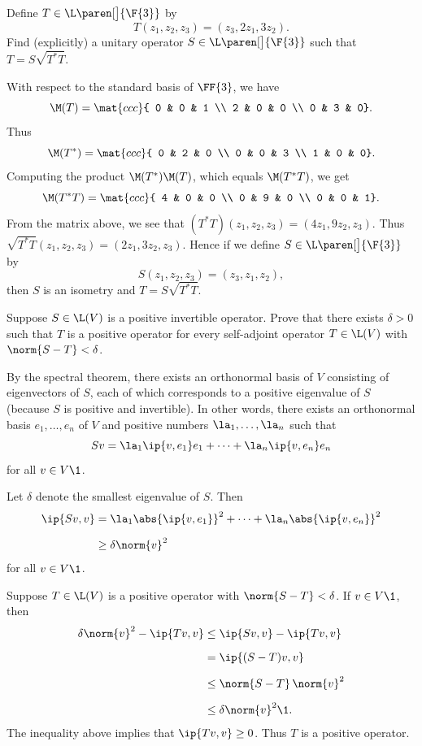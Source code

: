 \pagebreak[3]

\exercise
Define $T \in \L\paren[\big]{\F{3}}$ by
\[
T(z_1, z_2, z_3) = (z_3, 2z_1, 3z_2).
\]
Find (explicitly) a unitary operator $S \in \L\paren[\big]{\F{3}}$ such that $T = S \sqrt{T^*T}$.

\begin{Solution}
With respect to the standard basis of $\FF{3}$, we have
\[
\M(T) = \mat{ccc}{
0 & 0 & 1 \\
2 & 0 & 0 \\
0 & 3 & 0}.
\]
Thus
\[
\M(T^*) = \mat{ccc}{
0 & 2 & 0 \\
0 & 0 & 3 \\
1 & 0 & 0}.
\]
Computing the product $\M(T^*) \M(T)$, which equals $\M(T^* T)$, we get
\[
\M(T^* T) = \mat{ccc}{
4 & 0 & 0 \\
0 & 9 & 0 \\
0 & 0 & 1}.
\]
{}From the matrix above, we see that $(T^*T)(z_1, z_2, z_3) = (4z_1, 9z_2, z_3)$.
Thus $\sqrt{T^*T}(z_1, z_2, z_3) = (2z_1, 3z_2, z_3)$.  Hence if we define
$S \in \L\paren[\big]{\F{3}}$ by
\[
S(z_1, z_2, z_3) = (z_3, z_1, z_2),
\]
then $S$ is an isometry and $T = S \sqrt{T^*T}$.
\end{Solution}

\exercise
Suppose $S \in \L(V)$ is a positive invertible operator. Prove that there exists $\delta > 0$ such that $T$ is a positive operator for every self-adjoint operator $T \in \L(V)$ with $\norm{S-T} < \delta$.

\begin{Solution}
By the spectral theorem, there exists an orthonormal basis of $V$ consisting of eigenvectors of $S$, each of which corresponds to a positive eigenvalue of $S$ (because $S$ is positive and invertible). In other words, there exists an orthonormal basis
$e_1, \ldots, e_n$ of $V$ and positive numbers $\la_1, \ldots, \la_n$ such that
\[
Sv = \la_1 \ip{v, e_1}e_1 + \cdots + \la_n \ip{v, e_n} e_n
\]
for all $v \in V\1$.

Let $\delta$ denote the smallest eigenvalue of $S$. Then
\begin{align*}
\ip{Sv, v} &= \la_1 \abs{ \ip{v, e_1} }^2 + \cdots + \la_n \abs{ \ip{v, e_n} }^2 \\[6bp]
&\ge \delta \norm{v}^2
\end{align*}
for all $v \in V\1$.

Suppose $T \in \L(V)$ is a positive operator with $\norm{S-T} < \delta$. If $v \in V\1$, then
\begin{align*}
\delta \norm{v}^2 - \ip{Tv, v} &\le \ip{Sv, v} - \ip{Tv,v}\\[6bp]
&= \ip{ (S-T)v, v} \\[6bp]
&\le \norm{S-T} \, \norm{v}^2 \\[6bp]
&\le \delta \norm{v}^2\1.
\end{align*}
The inequality above implies that $\ip{Tv,v} \ge 0$. Thus $T$ is a positive operator.
\end{Solution}

